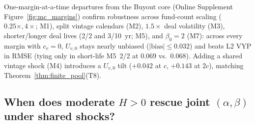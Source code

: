 \documentclass[12pt]{article}
\begin{document}
One-margin-at-a-time departures from the Buyout core (Online Supplement Figure~\ref{fig:mc_margins}) confirm robustness across fund-count scaling ($0.25\times, 4\times$; M1), split vintage calendars (M2), $1.5\times$ deal volatility (M3), shorter/longer deal lives (2/2 and 3/10~yr; M5), and $\beta_0 = 2$ (M7): across every margin with $c_v = 0$, $U_{v,0}$ stays nearly unbiased ($|\text{bias}| \le 0.032$) and beats L2 VYP in RMSE (tying only in short-life M5~2/2 at $0.069$ vs.\ $0.068$).
Adding a shared vintage shock (M4) introduces a $U_{v,0}$ tilt ($+0.042$ at $c$, $+0.143$ at $2c$), matching Theorem~\ref{thm:finite_pool}(T8).

\subsection{When does moderate $H>0$ rescue joint $(\alpha,\beta)$ under shared shocks?}
\label{sec:mc_alpha_beta}
\end{document}
